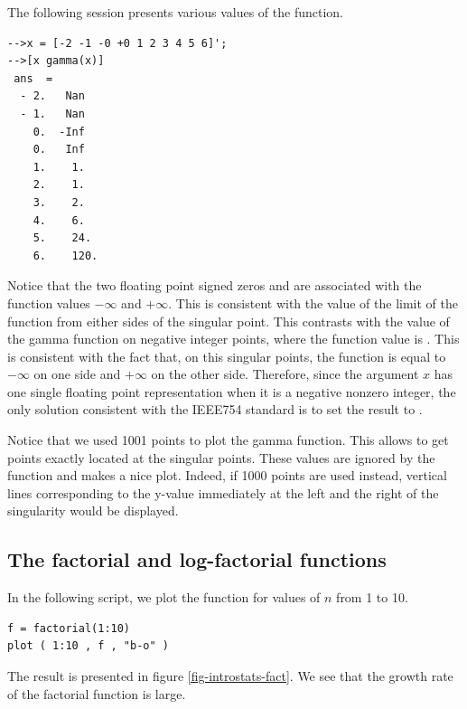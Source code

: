 The following session presents various values of the 
function.
\lstset{language=scilabscript}
\begin{lstlisting}
-->x = [-2 -1 -0 +0 1 2 3 4 5 6]';
-->[x gamma(x)]
 ans  =
  - 2.   Nan    
  - 1.   Nan    
    0.  -Inf    
    0.   Inf    
    1.    1.    
    2.    1.    
    3.    2.    
    4.    6.    
    5.    24.   
    6.    120.  
\end{lstlisting}

Notice that the two floating point signed zeros  and  are associated 
with the function values $-\infty$ and $+\infty$. This is consistent 
with the value of the limit of the function from either sides 
of the singular point. 
This contrasts with the value of the gamma function on negative 
integer points, where the function value is .
This is consistent with the fact that, on this singular points, 
the function is equal to $-\infty$ on one side and $+\infty$ on the other side.
Therefore, since the argument $x$ has one single floating 
point representation when it is a negative nonzero integer, the only 
solution consistent with the IEEE754 standard is to set the result to .

Notice that we used 1001 points to plot the gamma function. This 
allows to get points exactly located at the singular points.
These values are ignored by the  function and 
makes a nice plot. Indeed, if 1000 points are used instead, vertical
lines corresponding to the y-value immediately at the left and 
the right of the singularity would be displayed.


\subsection{The factorial and log-factorial functions}

In the following script, we plot the  function  
for values of $n$ from 1 to 10.
\lstset{language=scilabscript}
\begin{lstlisting}
f = factorial(1:10)
plot ( 1:10 , f , "b-o" )
\end{lstlisting}
The result is presented in figure \ref{fig-introstats-fact}.
We see that the growth rate of the factorial function is large.

